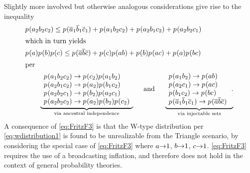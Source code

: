 \bigskip
Slightly more involved but otherwise analogous considerations give rise to the inequality
\begin{align}\label{eq:trifancyunmapped}
  &  \p{a_2 b_2 c_2}\leq {\p{\n{a}_1 \n{b}_1 \n{c}_1} + \p{a_1 b_2 c_2} + \p{a_2 b_1 c_2} + \p{a_2 b_2 c_1}} \\
\shortintertext{which in turn yields}
\label{eq:FritzF3}
  & \p{a} \p{b} \p{c} \leq {\p{\n{a} \n{b} \n{c}} +\p{c}\p{a b}  + \p{b}\p{a c}  + \p{a} \p{b c}}\\
\shortintertext{per}
&\qquad
 \underbrace{\begin{array}{l}
 \p{a_1 b_2 c_2}\to \p{c_2} \p{a_1 b_2} \\
 \p{a_2 b_1 c_2}\to \p{a_2} \p{b_1 c_2} \\
 \p{a_2 b_2 c_1}\to \p{b_2} \p{a_2 c_1} \\
 \p{a_2 b_2 c_2}\to \p{a_2} \p{b_2} \p{c_2} \\
\end{array}}_{\text{via ancestral independence}}   \quad \text{ and }\quad
\underbrace{\begin{array}{l}
\p{a_1 b_2} \to \p{a b} \\
\p{a_2 c_1} \to \p{a c} \\
\p{b_1 c_2} \to \p{b c} \\
\p{\n{a}_1 \n{b}_1 \n{c}_1}\to \p{\n{a} \n{b} \n{c}}  \\
\end{array}\,.}_{\text{via injectable sets}}
\end{align}
A consequence of \cref{eq:FritzF3} is that the W-type distribution per \cref{eq:wdistribution1}
is found to be unrealizable from the Triangle scenario, by considering the special case of \cref{eq:FritzF3} where $a\mathord{\to}1$, $b\mathord{\to}1$, $c\mathord{\to}1$. \cref{eq:FritzF3} requires the use of a broadcasting inflation, and therefore does not hold in the context of general probability theories.

